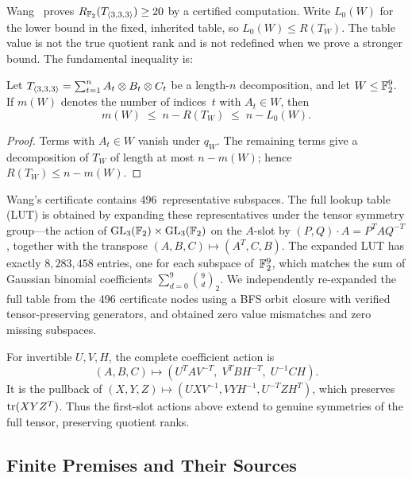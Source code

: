 \documentclass[11pt,a4paper]{article}
\begin{document}
Wang~\cite{wangautomated} proves $R_{\mathbb{F}_2}(T_{\langle3,3,3\rangle})\ge20$ by a certified computation. Write $L_0(W)$ for the lower bound in the fixed, inherited table, so $L_0(W)\le R(T_W)$. The table value is not the true quotient rank and is not redefined when we prove a stronger bound. The fundamental inequality is:

\begin{proposition}\label{prop:occupation}
  Let $T_{\langle3,3,3\rangle}=\sum_{t=1}^n A_t\otimes B_t\otimes C_t$ be a length-$n$ decomposition, and let $W\le\mathbb{F}_2^9$.  If $m(W)$ denotes the number of indices~$t$ with $A_t\in W$, then
  \begin{equation}\label{eq:occ}
    m(W)\;\le\; n-R(T_W)\;\le\;n-L_0(W).
  \end{equation}
\end{proposition}

\begin{proof}
  Terms with $A_t\in W$ vanish under $q_W$. The remaining terms give a decomposition of $T_W$ of length at most $n-m(W)$; hence $R(T_W)\le n-m(W)$.
\end{proof}

Wang's certificate contains 496~representative subspaces.  The full lookup table (LUT) is obtained by expanding these representatives under the tensor symmetry group---the action of $\operatorname{GL}_3(\mathbb{F}_2)\times\operatorname{GL}_3(\mathbb{F}_2)$ on the $A$-slot by $(P,Q)\cdot A = P^TAQ^{-T}$, together with the transpose $(A,B,C)\mapsto(A^T,C,B)$.  The expanded LUT has exactly $8{,}283{,}458$ entries, one for each subspace of~$\mathbb{F}_2^9$, which matches the sum of Gaussian binomial coefficients $\sum_{d=0}^9\binom{9}{d}_2$.  We independently re-expanded the full table from the 496 certificate nodes using a BFS orbit closure with verified tensor-preserving generators, and obtained zero value mismatches and zero missing subspaces.

For invertible $U,V,H$, the complete coefficient action is
\begin{equation}\label{eq:coefficient-action}
 (A,B,C)\longmapsto
 (U^TAV^{-T},\;V^TBH^{-T},\;U^{-1}CH).
\end{equation}
It is the pullback of $(X,Y,Z)\mapsto(UXV^{-1},VYH^{-1},U^{-T}ZH^T)$,
which preserves $\operatorname{tr}(XYZ^T)$. Thus the first-slot actions above extend
to genuine symmetries of the full tensor, preserving quotient ranks.

\subsection{Finite Premises and Their Sources}
\end{document}
